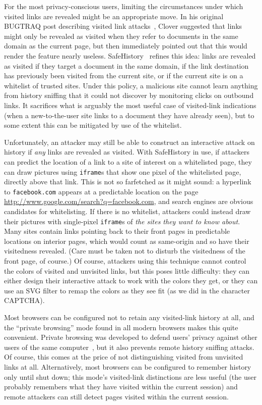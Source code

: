 \documentclass[conference]{IEEEtran}
\begin{document}
For the most privacy-conscious users, limiting the circumstances under
which visited links are revealed might be an appropriate move.  In his
original BUGTRAQ post describing visited link
attacks~\cite{bugtraq_visited}, Clover suggested that links might only
be revealed as visited when they refer to documents in the same domain
as the current page, but then immediately pointed out that this would
render the feature nearly useless.
SafeHistory~\cite{jackson06thirdpartycookies} refines this idea: links
are revealed as visited if they target a document in the same domain,
if the link destination has previously been visited from the current
site, or if the current site is on a whitelist of trusted sites.
Under this policy, a malicious site cannot learn anything from history
sniffing that it could not discover by monitoring clicks on outbound
links.  It sacrifices what is arguably the most useful case of
visited-link indications (when a new-to-the-user site links to a
document they have already seen), but to some extent this can be
mitigated by use of the whitelist.

Unfortunately, an attacker may still be able to construct an
interactive attack on history if \emph{any} links are revealed as
visited.  With SafeHistory in use, if attackers can predict the
location of a link to a site of interest on a whitelisted page, they
can draw pictures using \texttt{iframe}s that show one pixel of the
whitelisted page, directly above that link.  This is not so farfetched
as it might sound: a hyperlink to \texttt{facebook.com} appears at a
predictable location on the page
\url{http://www.google.com/search?q=facebook.com}, and search engines
are obvious candidates for whitelisting.  If there is no whitelist,
attackers could instead draw their pictures with single-pixel
\texttt{iframe}s of \emph{the sites they want to know about}.  Many
sites contain links pointing back to their front pages in predictable
locations on interior pages, which would count as same-origin and so
have their visitedness revealed.  (Care must be taken not to disturb
the visitedness of the front page, of course.)  Of course, attackers
using this technique cannot control the colors of visited and
unvisited links, but this poses little difficulty: they can either
design their interactive attack to work with the colors they get, or
they can use an SVG filter to remap the colors as they see fit (as we
did in the character CAPTCHA).

Most browsers can be configured not to retain any visited-link history
at all, and the “private browsing” mode found in all modern browsers
makes this quite convenient.  Private browsing was developed to defend
users' privacy against other users of the same
computer~\cite{private_browsing_paper}, but it also prevents remote
history sniffing attacks.  Of course, this comes at the price of not
distinguishing visited from unvisited links at all.  Alternatively,
most browsers can be configured to remember history only until shut
down; this mode's visited-link distinctions are less useful (the user
probably remembers what they have visited within the current session)
and remote attackers can still detect pages visited within the current
session.
\end{document}
